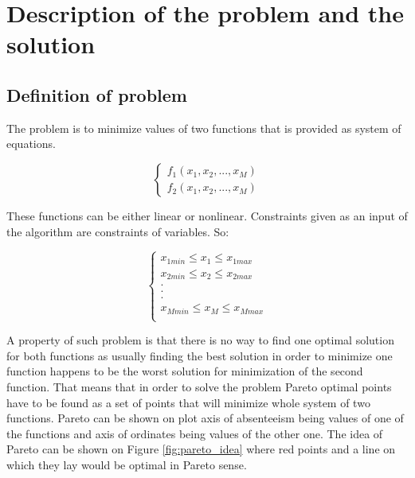 \documentclass[a4paper, 11pt]{article}
\begin{document}
	\section{Description of the problem and the solution}
	
	\subsection{Definition of problem}
		
	The problem is to minimize values of two functions that is provided as system
	of equations.
	
	$$\begin{cases}
		f_{1}(x_{1},x_{2},...,x_{M})\\
		f_{2}(x_{1},x_{2},...,x_{M})
	\end{cases}$$
	
	These functions can be either linear or nonlinear. Constraints given as an
	input of the algorithm are constraints of variables. So:
	
	$$\begin{cases}
		x_{1min} \leq x_{1} \leq x_{1max}\\
		x_{2min} \leq x_{2} \leq x_{2max}\\
		.\\
		.\\
		.\\
		x_{Mmin} \leq x_{M} \leq x_{Mmax}\\
	\end{cases}$$
	
	A property of such problem is that there is no way to find one optimal solution
	for both functions as usually finding the best solution in order to minimize
	one function happens to be the worst solution for minimization of the second
	function. That means that in order to solve the problem Pareto optimal points 
	have to be found as a set of points that will minimize whole system of two 
	functions. Pareto can be shown on plot axis of absenteeism being values of
	one of the functions and axis of ordinates being values of the other one.
	The idea of Pareto can be shown on Figure \ref{fig:pareto_idea} where red
	points and a line on which they lay would be optimal in Pareto sense.
	
\end{document}
